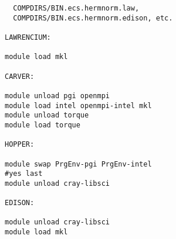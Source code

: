 \begin{verbatim}
  COMPDIRS/BIN.ecs.hermnorm.law, 
  COMPDIRS/BIN.ecs.hermnorm.edison, etc.

LAWRENCIUM:

module load mkl

CARVER:

module unload pgi openmpi
module load intel openmpi-intel mkl
module unload torque
module load torque

HOPPER:

module swap PrgEnv-pgi PrgEnv-intel
#yes last
module unload cray-libsci

EDISON:

module unload cray-libsci
module load mkl

\end{verbatim}
